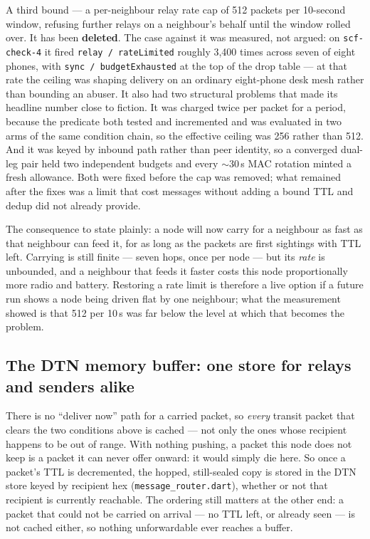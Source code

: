 \documentclass[11pt]{report}
\newcommand{\code}[1]{\texttt{\small #1}}
\begin{document}
A third bound --- a per-neighbour relay rate cap of 512 packets per 10-second window, refusing further relays on a neighbour's behalf until the window rolled over. It has been \textbf{deleted}. The case against it was measured, not argued: on \code{scf-check-4} it fired \code{relay / rateLimited} roughly 3{,}400 times across seven of eight phones, with \code{sync / budgetExhausted} at the top of the drop table --- at that rate the ceiling was shaping delivery on an ordinary eight-phone desk mesh rather than bounding an abuser. It also had two structural problems that made its headline number close to fiction. It was charged twice per packet for a period, because the predicate both tested and incremented and was evaluated in two arms of the same condition chain, so the effective ceiling was 256 rather than 512. And it was keyed by inbound path rather than peer identity, so a converged dual-leg pair held two independent budgets and every ${\sim}30$\,s MAC rotation minted a fresh allowance. Both were fixed before the cap was removed; what remained after the fixes was a limit that cost messages without adding a bound TTL and dedup did not already provide.

The consequence to state plainly: a node will now carry for a neighbour as fast as that neighbour can feed it, for as long as the packets are first sightings with TTL left. Carrying is still finite --- seven hops, once per node --- but its \emph{rate} is unbounded, and a neighbour that feeds it faster costs this node proportionally more radio and battery. Restoring a rate limit is therefore a live option if a future run shows a node being driven flat by one neighbour; what the measurement showed is that 512 per 10\,s was far below the level at which that becomes the problem.

\subsection*{The DTN memory buffer: one store for relays and senders alike}

There is no ``deliver now'' path for a carried packet, so \emph{every} transit packet that clears the two conditions above is cached --- not only the ones whose recipient happens to be out of range. With nothing pushing, a packet this node does not keep is a packet it can never offer onward: it would simply die here. So once a packet's TTL is decremented, the hopped, still-sealed copy is stored in the DTN store keyed by recipient hex (\code{message\_router.dart}), whether or not that recipient is currently reachable. The ordering still matters at the other end: a packet that could not be carried on arrival --- no TTL left, or already seen --- is not cached either, so nothing unforwardable ever reaches a buffer.
\end{document}
